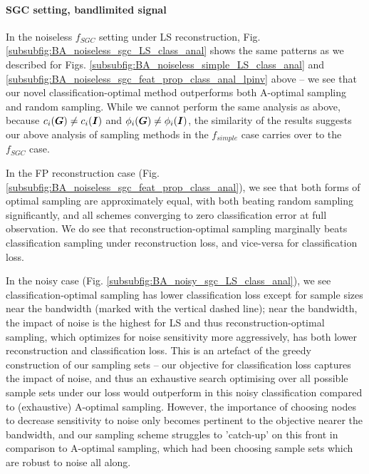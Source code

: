 \paragraph{SGC setting, bandlimited signal}In the noiseless $f_{SGC}$ setting under LS reconstruction, Fig. \ref{subsubfig:BA_noiseless_sgc_LS_class_anal} shows the same patterns as we described for Figs. \ref{subsubfig:BA_noiseless_simple_LS_class_anal} and \ref{subsubfig:BA_noiseless_sgc_feat_prop_class_anal_lpinv} above -- we see that our novel classification-optimal method outperforms both A-optimal sampling and random sampling. While we cannot perform the same analysis as above, because $c_{i}(\bm{G}) \neq c_{i}(\bm{I})$ and $\phi_{i}(\bm{G}) \neq \phi_{i}(\bm{I})$, the similarity of the results suggests our above analysis of sampling methods in the $f_{simple}$ case carries over to the $f_{SGC}$ case. 

In the FP reconstruction case (Fig. \ref{subsubfig:BA_noiseless_sgc_feat_prop_class_anal}), we see that both forms of optimal sampling are approximately equal, with both beating random sampling significantly, and all schemes converging to zero classification error at full observation. We do see that reconstruction-optimal sampling marginally beats classification sampling under reconstruction loss, and vice-versa for classification loss.

In the noisy case (Fig. \ref{subsubfig:BA_noisy_sgc_LS_class_anal}), we see classification-optimal sampling has lower classification loss except for sample sizes near the bandwidth (marked with the vertical dashed line); near the bandwidth, the impact of noise is the highest for LS \cite{sripathmanathan2024impact} and thus reconstruction-optimal sampling, which optimizes for noise sensitivity more aggressively, has both lower reconstruction and classification loss. This is an artefact of the greedy construction of our sampling sets -- our objective for classification loss captures the impact of noise, and thus an exhaustive search optimising over all possible sample sets under our loss would outperform in this noisy classification compared to (exhaustive) A-optimal sampling. However, the importance of choosing nodes to decrease sensitivity to noise only becomes pertinent to the objective nearer the bandwidth, and our sampling scheme struggles to 'catch-up' on this front in comparison to A-optimal sampling, which had been choosing sample sets which are robust to noise all along.  

